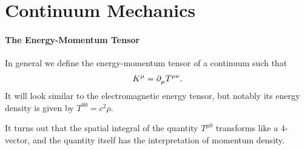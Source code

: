 \section{Continuum Mechanics}

\paragraph{The Energy-Momentum Tensor}
In general we define the energy-momentum tensor of a continuum such that
\begin{align*}
	K^{\mu} = \partial^{}_{\mu}T^{\mu\nu}.
\end{align*}
It will look similar to the electromagnetic energy tensor, but notably its energy density is given by $T^{00} = c^{2}\rho$.

It turns out that the spatial integral of the quantity $T^{\mu 0}$ transforms like a $4$-vector, and the quantity itself has the interpretation of momentum density.